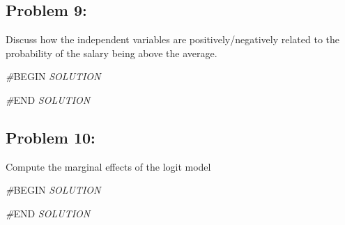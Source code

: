 \documentclass[
]{article}
\newenvironment{Shaded}{\begin{snugshade}}{\end{snugshade}}
\newcommand{\CommentTok}[1]{\textcolor[rgb]{0.56,0.35,0.01}{\textit{#1}}}
\newcommand{\RegionMarkerTok}[1]{#1}
\begin{document}
\subsection{Problem 9:}\label{problem-9}

Discuss how the independent variables are positively/negatively related
to the probability of the salary being above the average.

\begin{Shaded}
\begin{Highlighting}[]
\CommentTok{\#}\RegionMarkerTok{BEGIN}\CommentTok{ SOLUTION}

\CommentTok{\#}\RegionMarkerTok{END}\CommentTok{ SOLUTION}
\end{Highlighting}
\end{Shaded}

\subsection{Problem 10:}\label{problem-10}

Compute the marginal effects of the logit model

\begin{Shaded}
\begin{Highlighting}[]
\CommentTok{\#}\RegionMarkerTok{BEGIN}\CommentTok{ SOLUTION}

\CommentTok{\#}\RegionMarkerTok{END}\CommentTok{ SOLUTION}
\end{Highlighting}
\end{Shaded}
\end{document}
